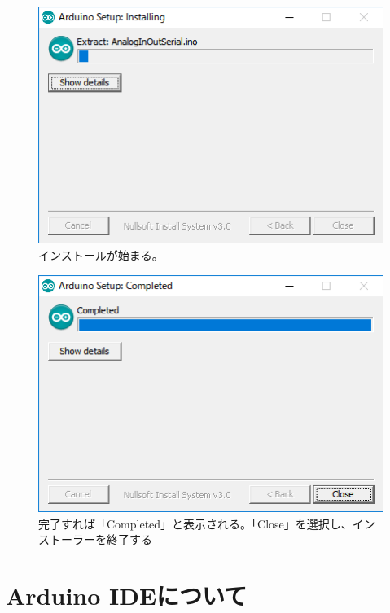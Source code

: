 \documentclass[uplatex]{jsarticle}
\begin{document}
\begin{figure}
    \centering
    \includegraphics[width=13cm]{arduino_4.png}
    \caption{インストールが始まる。}
\end{figure}
\begin{figure}
    \centering
    \includegraphics[width=13cm]{arduino_5.png}
    \caption{完了すれば「Completed」と表示される。「Close」を選択し、インストーラーを終了する}
\end{figure}

\clearpage
\section{Arduino IDEについて}
\end{document}
